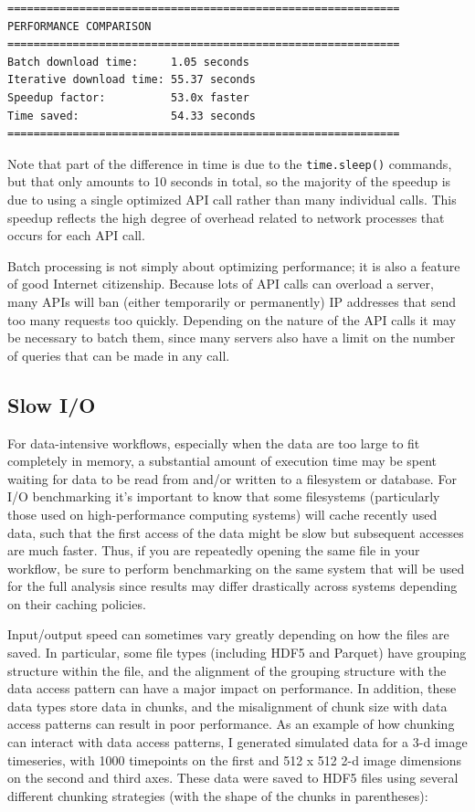 \begin{lstlisting}[style=shell]
============================================================
PERFORMANCE COMPARISON
============================================================
Batch download time:     1.05 seconds
Iterative download time: 55.37 seconds
Speedup factor:          53.0x faster
Time saved:              54.33 seconds
============================================================
\end{lstlisting}

Note that part of the difference in time is due to the \texttt{time.sleep()} commands, but that only amounts to 10 seconds in total, so the majority of the speedup is due to using a single optimized API call rather than many individual calls.  This speedup reflects the high degree of overhead related to network processes that occurs for each API call.

Batch processing is not simply about optimizing performance; it is also a feature of good Internet citizenship.  Because lots of API calls can overload a server, many APIs will ban (either temporarily or permanently) IP addresses that send too many requests too quickly.  Depending on the nature of the API calls it may be necessary to batch them, since many servers also have a limit on the number of queries that can be made in any call.

\subsection{Slow I/O}

For data-intensive workflows, especially when the data are too large to fit completely in memory, a substantial amount of execution time may be spent waiting for data to be read from and/or written to a filesystem or database. For I/O benchmarking it's important to know that some filesystems (particularly those used on high-performance computing systems) will cache recently used data, such that the first access of the data might be slow but subsequent accesses are much faster. Thus, if you are repeatedly opening the same file in your workflow, be sure to perform benchmarking on the same system that will be used for the full analysis since results may differ drastically across systems depending on their caching policies.

Input/output speed can sometimes vary greatly depending on how the files are saved. In particular, some file types (including HDF5 and Parquet) have grouping structure within the file, and the alignment of the grouping structure with the data access pattern can have a major impact on performance. In addition, these data types store data in chunks, and the misalignment of chunk size with data access patterns can result in poor performance. As an example of how chunking can interact with data access patterns, I generated simulated data for a 3-d image timeseries, with 1000 timepoints on the first and 512 x 512 2-d image dimensions on the second and third axes.  These data were saved to HDF5 files using several different chunking strategies (with the shape of the chunks in parentheses):

